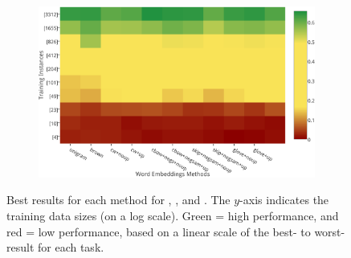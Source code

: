 \begin{figure}
\begin{subfigure}{7cm}
	\subcaption{\ner \fscore}	
	\label{ner}
\end{subfigure}
\begin{subfigure}{7cm}
	\centering
    \includegraphics[scale=0.4]{plots/map-mwe-color-invert}
	\subcaption{\mwe \fscore}		
	\label{mwe}
\end{subfigure}
\caption{Best results for each method for \pos, \chunking, \ner and
  \mwe. The $y$-axis indicates the training data
  sizes (on a log scale). Green = high performance, and red = low
  performance, based on a linear scale of the best- to worst-result for
  each task. }
\label{fig:heatmaps}
\end{figure}


